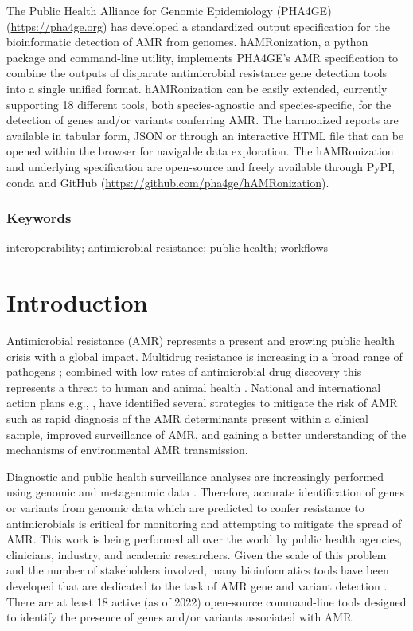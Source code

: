 The Public Health Alliance for Genomic Epidemiology (PHA4GE) (\url{https://pha4ge.org}) has developed a standardized output specification for the bioinformatic detection of AMR from genomes. hAMRonization, a python package and command-line utility, implements PHA4GE’s AMR specification to combine the outputs of disparate antimicrobial resistance gene detection tools into a single unified format.  hAMRonization can be easily extended, currently supporting 18 different tools, both species-agnostic and species-specific, for the detection of genes and/or variants conferring AMR. The harmonized reports are available in tabular form, JSON or through an interactive HTML file that can be opened within the browser for navigable data exploration. The hAMRonization and underlying specification are open-source and freely available through PyPI, conda and GitHub (\url{https://github.com/pha4ge/hAMRonization}).

\subsubsection{Keywords}

interoperability; antimicrobial resistance; public health; workflows

\section{Introduction}

Antimicrobial resistance (AMR) represents a present and growing public health crisis with a global impact. Multidrug resistance is increasing in a broad range of pathogens \cite{aslam_antibiotic_2018}; combined with low rates of antimicrobial drug discovery \cite{brown_antibacterial_2016} this represents a threat to human and animal health \cite{who_who_2015}. National and international action plans e.g., \cite{jim_oneill_antimicrobial_2014, jim_oneill_tackling_2016,public_health_agency_of_canada_antimicrobial_2014,who_who_2015}, have identified several strategies to mitigate the risk of AMR such as rapid diagnosis of the AMR determinants present within a clinical sample, improved surveillance of AMR, and gaining a better understanding of the mechanisms of environmental AMR transmission.

Diagnostic and public health surveillance analyses are increasingly performed using genomic and metagenomic data \cite{mcarthur_antimicrobial_2017}. Therefore, accurate identification of genes or variants from genomic data which are predicted to confer resistance to antimicrobials is critical for monitoring and attempting to mitigate the spread of AMR. This work is being performed all over the world by public health agencies, clinicians, industry, and academic researchers. Given the scale of this problem and the number of stakeholders involved, many bioinformatics tools have been developed that are dedicated to the task of AMR gene and variant detection \cite{boolchandani_sequencing-based_2019,hendriksen_using_2019,mcarthur_antimicrobial_2017}. There are at least 18 active (as of 2022) open-source command-line tools designed to identify the presence of genes and/or variants associated with AMR.  

